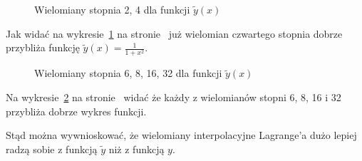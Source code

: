 \documentclass[a4paper,11pt]{article}
\begin{document}
\begin{figure}[h]
    \begin{center}
        
    \end{center}
    \caption{Wielomiany stopnia 2, 4 dla funkcji \(\tilde{y}(x)\)}
    \label{jedn_y_prim_2,4}
\end{figure}

Jak widać na wykresie~\ref{jedn_y_prim_2,4} na stronie~\pageref{jedn_y_prim_2,4}
już wielomian czwartego stopnia dobrze przybliża funkcję 
\(\tilde{y}(x)=\frac{1}{1+x^2}\). 

\begin{figure}[h]
    \begin{center}
        
    \end{center}
    \caption{Wielomiany stopnia 6, 8, 16, 32 dla funkcji \(\tilde{y}(x)\)}
    \label{jedn_y_prim_6,8,16,32}
\end{figure}

Na wykresie~\ref{jedn_y_prim_6,8,16,32} na stronie~\pageref{jedn_y_prim_6,8,16,32}
widać że każdy z wielomianów stopni 6, 8, 16 i 32 przybliża dobrze wykres funkcji.

Stąd można wywnioskować, że wielomiany interpolacyjne Lagrange'a dużo lepiej
radzą sobie z funkcją \(\tilde{y}\) niż z funkcją \(y\).
\end{document}
